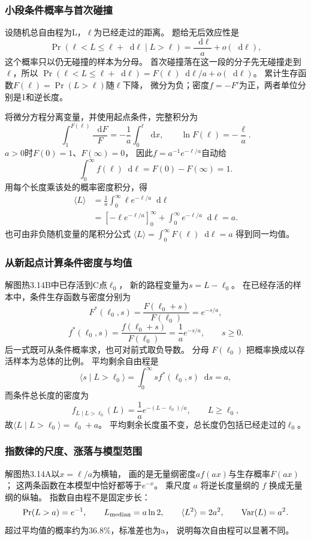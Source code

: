 \documentclass[UTF8,fontset=fandol,a4paper,11pt]{ctexart}
\newcommand{\dd}{\mathop{}\!\mathrm{d}}
\begin{document}
\subsubsection*{小段条件概率与首次碰撞}
设随机总自由程为L，$\ell$为已经走过的距离。
题给无后效应性是
\[
\Pr(\ell<L\le\ell+\dd\ell\mid L>\ell)
=\frac{\dd\ell}{a}+o(\dd\ell),
\]
这个概率只以仍无碰撞的样本为分母。
首次碰撞落在这一段的分子先无碰撞走到 $\ell$，所以
$\Pr(\ell<L\le\ell+\dd\ell)=F(\ell)\dd\ell/a+o(\dd\ell)$。
累计生存函数$F(\ell)=\Pr(L>\ell)$随$\ell$下降，
微分为负；密度$f=-F'$为正，两者单位分别是1和逆长度。

将微分方程分离变量，并使用起点条件，完整积分为
\[
\int_1^{F(\ell)}\frac{\dd F}{F}
=-\frac1a\int_0^\ell\dd x,\qquad
\ln F(\ell)=-\frac{\ell}{a}.
\]
$a>0$时$F(0)=1$、$F(\infty)=0$，
因此$f=a^{-1}e^{-\ell/a}$自动给
\[
\int_0^\infty f(\ell)\dd\ell
=F(0)-F(\infty)=1.
\]
用每个长度乘该处的概率密度积分，得
\[
\begin{aligned}
\langle L\rangle
&=\frac1a\int_0^\infty\ell e^{-\ell/a}\dd\ell\\
&=[-\ell e^{-\ell/a}]_0^\infty
+\int_0^\infty e^{-\ell/a}\dd\ell=a.
\end{aligned}
\]
也可由非负随机变量的尾积分公式
$\langle L\rangle=\int_0^\infty F(\ell)\dd\ell=a$ 得到同一均值。

\subsubsection*{从新起点计算条件密度与均值}
解图热3.14B中已存活到C点$\ell_0$，
新的路程变量为$s=L-\ell_0$。
在已经存活的样本中，条件生存函数与密度分别为
\[
F^*(\ell_0,s)=\frac{F(\ell_0+s)}{F(\ell_0)}
=e^{-s/a},
\]
\[
f^*(\ell_0,s)=\frac{f(\ell_0+s)}{F(\ell_0)}
=\frac1a e^{-s/a},\qquad s\ge0.
\]
后一式既可从条件概率求，也可对前式取负导数。
分母 $F(\ell_0)$ 把概率换成以存活样本为总体的比例。
平均剩余自由程是
\[
\langle s\mid L>\ell_0\rangle
=\int_0^\infty s f^*(\ell_0,s)\dd s=a,
\]
而条件总长度的密度为
\[
f_{L\mid L>\ell_0}(L)
=\frac1a e^{-(L-\ell_0)/a},\qquad L\ge\ell_0,
\]
故$\langle L\mid L>\ell_0\rangle=\ell_0+a$。
平均剩余长度虽不变，总长度仍包括已经走过的$\ell_0$。

\subsubsection*{指数律的尺度、涨落与模型范围}
解图热3.14A以$x=\ell/a$为横轴，
画的是无量纲密度$a f(ax)$与生存概率$F(ax)$；
这两条函数在本模型中恰好都等于$e^{-x}$。
乘尺度 $a$ 将逆长度量纲的 $f$ 换成无量纲的纵轴。
指数自由程不是固定步长：
\[
\Pr(L>a)=e^{-1},\qquad
L_{\rm median}=a\ln2,\qquad
\langle L^2\rangle=2a^2,\qquad
\operatorname{Var}(L)=a^2.
\]
超过平均值的概率约为$36.8\%$，标准差也为a，
说明每次自由程可以显著不同。
\end{document}
